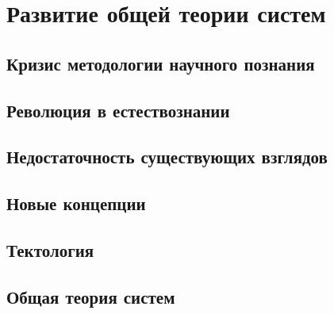 \chapter{Развитие общей теории систем}
\section{Кризис методологии научного познания}

\section{Революция в естествознании}

\section{Недостаточность существующих взглядов}

\section{Новые концепции}

\section{Тектология}

\section{Общая теория систем}
